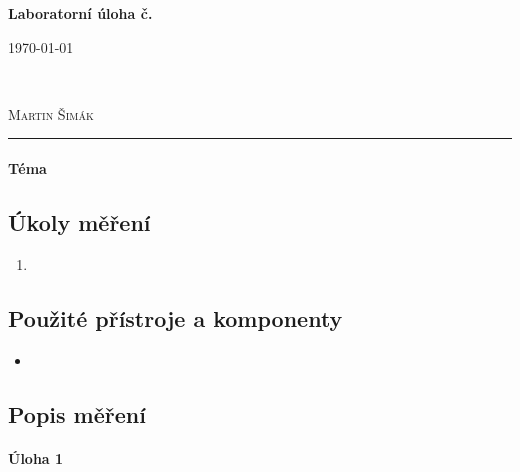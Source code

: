\documentclass[11pt,a4paper]{article}
\begin{document}

\begin{center}
    {\LARGE\textbf{Laboratorní úloha č.}}\\[3mm]
    \begin{minipage}{0.4\textwidth}
        \begin{flushleft}
            \textsc{\today}
        \end{flushleft}
    \end{minipage}
    ~
    \begin{minipage}{0.4\textwidth}
        \begin{flushright}
            \textsc{Martin Šimák}
        \end{flushright}
    \end{minipage}
    \noindent\rule{14.5cm}{0.4pt}
\end{center}

\paragraph*{Téma} \lipsum[5]

\subsection*{Úkoly měření}
\begin{enumerate}
    \item 
\end{enumerate}

\subsection*{Použité přístroje a komponenty}
\begin{itemize}
    \item 
\end{itemize}

\subsection*{Popis měření}
\lipsum[1]

\paragraph*{Úloha 1} \lipsum[5]

\end{document}
